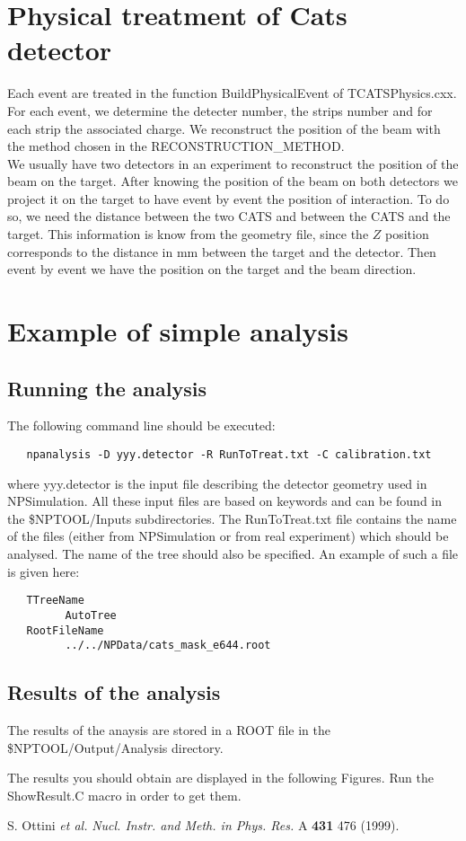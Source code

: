\documentclass[a4paper,12pt]{article}
\begin{document}
\section{Physical treatment of Cats detector}
Each event are treated in the function BuildPhysicalEvent of TCATSPhysics.cxx. For each event, we determine the detecter number, the strips number and for each strip the associated charge. We reconstruct the position of the beam with the method chosen in the RECONSTRUCTION\_METHOD.\\
We usually have two detectors in an experiment to reconstruct the position of the beam on the target. After knowing the position of the beam on both detectors we project it on the target to have event by event the position of interaction. To do so, we need the distance between the two CATS and between the CATS and the target. This information is know from the geometry file, since the $Z$ position corresponds to the distance in mm between the target and the detector. Then event by event we have the position on the target and the beam direction.

\section{Example of simple analysis}
\subsection{Running the analysis}
The following command line should be executed:

\begin{verbatim}
   npanalysis -D yyy.detector -R RunToTreat.txt -C calibration.txt
\end{verbatim}

where yyy.detector is the input file describing the detector geometry used in NPSimulation. All these input files are based on keywords and can be found  in the \$NPTOOL/Inputs subdirectories. The RunToTreat.txt file contains the name of the files (either from NPSimulation or from real experiment) which should be analysed. The name of the tree should also be specified. An example of such a file is given here:

\begin{verbatim}
   TTreeName
         AutoTree
   RootFileName
         ../../NPData/cats_mask_e644.root
\end{verbatim}


\subsection{Results of the analysis}
The results of the anaysis are stored in a ROOT file in the \$NPTOOL/Output/Analysis
directory. 

The results you should obtain are displayed in the following Figures. Run the 
ShowResult.C macro in order to get them.

\begin{thebibliography}{99}
 S. Ottini {\it et al.} {\it Nucl. Instr. and Meth. in Phys. Res.} A {\bf 431} 476 (1999).
\end{thebibliography}
\end{document}

